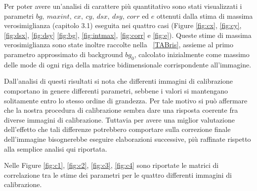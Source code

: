 Per poter avere un'analisi di carattere più quantitativo sono stati visualizzati i parametri $bg,\ maxint,\ cx,\ cy,\ dsx,\ dsy,\ corr$ ed $e$ ottenuti dalla stima di massima verosimiglianza (capitolo 3.1) eseguita nei quattro casi (Figure \ref{fig:cx}, \ref{fig:cy}, \ref{fig:dsx}, \ref{fig:dsy} \ref{fig:bg}, \ref{fig:intmax}, \ref{fig:corr} e \ref{fig:e}).
Queste stime di massima verosimiglianza sono state inoltre raccolte nella \tablename~\ref{TABris}, assieme al primo parametro approssimato di background $bg_0$, calcolato inizialmente come massimo delle mode di ogni riga della matrice bidimensionale corrispondente all'immagine.

Dall'analisi di questi risultati si nota che differenti immagini di calibrazione comportano in genere differenti parametri, sebbene i valori si mantengano solitamente entro lo stesso ordine di grandezza. 
Per tale motivo si può affermare che la nostra procedura di calibrazione sembra dare una risposta coerente fra diverse immagini di calibrazione.
Tuttavia per avere una miglior valutazione dell'effetto che tali differenze potrebbero comportare sulla correzione finale dell'immagine bisognerebbe eseguire elaborazioni successive, più raffinate rispetto alla semplice analisi qui riportata.

Nelle Figure \ref{fig:c1}, \ref{fig:c2}, \ref{fig:c3}, \ref{fig:c4} sono riportate le matrici di correlazione tra le stime dei parametri per le quattro differenti immagini di calibrazione.

